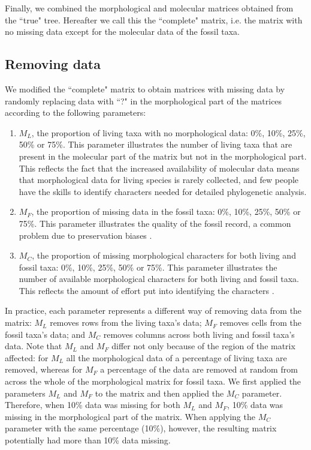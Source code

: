 \documentclass[12pt,letterpaper]{article}
\begin{document}
Finally, we combined the morphological and molecular matrices obtained from the ``true" tree. Hereafter we call this the ``complete" matrix, i.e. the matrix with no missing data except for the molecular data of the fossil taxa.

\subsection{Removing data}
\label{Removing_data}
We modified the ``complete" matrix to obtain matrices with missing data by randomly replacing data with ``?" in the morphological part of the matrices according to the following parameters:
\begin{enumerate}
\item{$M_{L}$, the proportion of living taxa with no morphological data: 0\%, 10\%, 25\%, 50\% or 75\%.}
This parameter illustrates the number of living taxa that are present in the molecular part of the matrix but not in the morphological part. This reflects the fact that the increased availability of molecular data means that morphological data for living species is rarely collected, and few people have the skills to identify characters needed for detailed phylogenetic analysis.
\item{$M_{F}$, the proportion of missing data in the fossil taxa: 0\%, 10\%, 25\%, 50\% or 75\%.}
This parameter illustrates the quality of the fossil record, a common problem due to preservation biases \citep{sansomfossilization2013}. 
\item{$M_{C}$, the proportion of missing morphological characters for both living and fossil taxa: 0\%, 10\%, 25\%, 50\% or 75\%. }
This parameter illustrates the number of available morphological characters for both living and fossil taxa. This reflects the amount of effort put into identifying the characters \citep[e.g][]{O'Leary08022013}.
\end{enumerate}

In practice, each parameter represents a different way of removing data from the matrix: $M_L$ removes rows from the living taxa's data; $M_F$ removes cells from the fossil taxa's data; and $M_C$ removes columns across both living and fossil taxa's data.
Note that $M_L$ and $M_F$ differ not only because of the region of the matrix affected: for $M_L$ all the morphological data of a percentage of living taxa are removed, whereas for $M_F$ a percentage of the data are removed at random from across the whole of the morphological matrix for fossil taxa.
We first applied the parameters $M_L$ and $M_F$ to the matrix and then applied the $M_C$ parameter.
Therefore, when 10\% data was missing for both $M_L$ and $M_F$, 10\% data was missing in the morphological part of the matrix.
When applying the $M_C$ parameter with the same percentage (10\%), however, the resulting matrix potentially had more than 10\% data missing.
\end{document}
